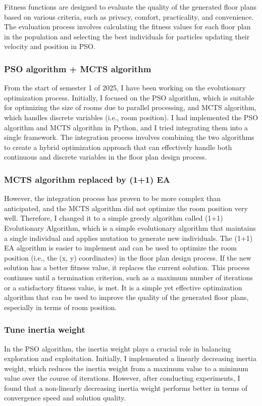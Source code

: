 \documentclass[]{article}
\begin{document}
Fitness functions are designed to evaluate the quality of the generated floor plans based on various criteria, such as privacy, comfort, practicality, and convenience. The evaluation process involves calculating the fitness values for each floor plan in the population and selecting the best individuals for particles updating their velocity and position in PSO.

\subsubsection{PSO algorithm + MCTS algorithm}
From the start of semester 1 of 2025, I have been working on the evolutionary optimization process. Initially, I focused on the PSO algorithm, which is suitable for optimizing the size of rooms due to parallel processing, and MCTS algorithm, which handles discrete variables (i.e., room position). I had implemented the PSO algorithm and MCTS algorithm in Python, and I tried integrating them into a single framework. The integration process involves combining the two algorithms to create a hybrid optimization approach that can effectively handle both continuous and discrete variables in the floor plan design process.

\subsubsection{MCTS algorithm replaced by (1+1) EA}
However, the integration process has proven to be more complex than anticipated, and the MCTS algorithm did not optimize the room position very well. Therefore, I changed it to a simple greedy algorithm called (1+1) Evolutionary Algorithm, which is a simple evolutionary algorithm that maintains a single individual and applies mutation to generate new individuals. The (1+1) EA algorithm is easier to implement and can be used to optimize the room position (i.e., the (x, y) coordinates) in the floor plan design process. If the new solution has a better fitness value, it replaces the current solution. This process continues until a termination criterion, such as a maximum number of iterations or a satisfactory fitness value, is met. It is a simple yet effective optimization algorithm that can be used to improve the quality of the generated floor plans, especially in terms of room position.

\subsubsection{Tune inertia weight}
In the PSO algorithm, the inertia weight plays a crucial role in balancing exploration and exploitation. Initially, I implemented a linearly decreasing inertia weight, which reduces the inertia weight from a maximum value to a minimum value over the course of iterations. However, after conducting experiments, I found that a non-linearly decreasing inertia weight performs better in terms of convergence speed and solution quality.
\end{document}

